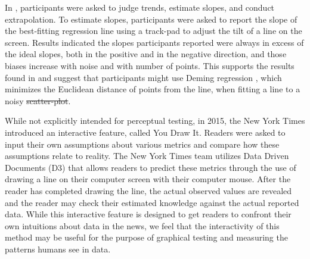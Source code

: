 \documentclass[12pt]{article}
\providecommand{\DIFaddtex}[1]{{\protect\color{blue}\uwave{#1}}} %
\providecommand{\DIFdeltex}[1]{{\protect\color{red}\sout{#1}}}                      %
\providecommand{\DIFaddbegin}{} %
\providecommand{\DIFaddend}{} %
\providecommand{\DIFdelbegin}{} %
\providecommand{\DIFdelend}{} %
\providecommand{\DIFadd}[1]{\texorpdfstring{\DIFaddtex{#1}}{#1}} %
\providecommand{\DIFdel}[1]{\texorpdfstring{\DIFdeltex{#1}}{}} %
\newcommand{\DIFscaledelfig}{0.5}
\newlength{\DIFdelgraphicswidth} %
\newlength{\DIFdelgraphicsheight} %
\newcommand{\DIFaddincludegraphics}[2][]{{\color{blue}\fbox{\DIFOincludegraphics[#1]{#2}}}} %
\newcommand{\DIFdelincludegraphics}[2][]{%
\sbox{\DIFdelgraphicsbox}{\DIFOincludegraphics[#1]{#2}}%
\settoboxwidth{\DIFdelgraphicswidth}{\DIFdelgraphicsbox} %
\settoboxtotalheight{\DIFdelgraphicsheight}{\DIFdelgraphicsbox} %
\scalebox{\DIFscaledelfig}{%
\parbox[b]{\DIFdelgraphicswidth}{\usebox{\DIFdelgraphicsbox}\\[-\baselineskip] \rule{\DIFdelgraphicswidth}{0em}}\llap{\resizebox{\DIFdelgraphicswidth}{\DIFdelgraphicsheight}{%
\setlength{\unitlength}{\DIFdelgraphicswidth}%
\begin{picture}(1,1)%
\thicklines\linethickness{2pt} %
{\color[rgb]{1,0,0}\put(0,0){\framebox(1,1){}}}%
{\color[rgb]{1,0,0}\put(0,0){\line( 1,1){1}}}%
{\color[rgb]{1,0,0}\put(0,1){\line(1,-1){1}}}%
\end{picture}%
}\hspace*{3pt}}} %
} %
\DeclareRobustCommand{\DIFaddbegin}{\DIFOaddbegin \let\includegraphics\DIFaddincludegraphics} %
\DeclareRobustCommand{\DIFaddend}{\DIFOaddend \let\includegraphics\DIFOincludegraphics} %
\DeclareRobustCommand{\DIFdelbegin}{\DIFOdelbegin \let\includegraphics\DIFdelincludegraphics} %
\DeclareRobustCommand{\DIFdelend}{\DIFOaddend \let\includegraphics\DIFOincludegraphics} %
\begin{document}
In \citet{ciccione2021can}, participants were asked to judge trends,
estimate slopes, and conduct extrapolation. To estimate slopes,
participants were asked to report the slope of the best-fitting
regression line using a track-pad to adjust the tilt of a line on the
screen. Results indicated the slopes participants reported were always
in excess of the ideal slopes, both in the positive and in the negative
direction, and those biases increase with noise and with number of
points. This supports the results found in \citet{mosteller1981eye} and
suggest that participants might use Deming regression
\citep{deming1943statistical, linnet1998performance, martin2000general},
which minimizes the Euclidean distance of points from the line, when
fitting a line to a noisy \DIFdelbegin \DIFdel{scatter-plot}\DIFdelend \DIFaddbegin \DIFadd{scatterplot}\DIFaddend .

While not explicitly intended for perceptual testing, in 2015, the New
York Times introduced an interactive feature, called \DIFaddbegin \DIFadd{`}\DIFaddend You Draw It\DIFaddbegin \DIFadd{'
}\DIFaddend \citep{aisch_cox_quealy_2015, buchanan_park_pearce_2017, katz_2017}.
Readers were asked to input their own assumptions about various metrics
and compare how these assumptions relate to reality. The New York Times
team utilizes Data Driven Documents (D3) \citep{bostock2011d3} that
allows readers to predict these metrics through the use of drawing a
line on their computer screen with their computer mouse. After the
reader has completed drawing the line, the actual observed values are
revealed and the reader may check their estimated knowledge against the
actual reported data. While this interactive feature is designed to get
readers to confront their own intuitions about data in the news, we feel
that the interactivity of this method may be useful for the purpose of
graphical testing and measuring the patterns humans see in data.
\end{document}
